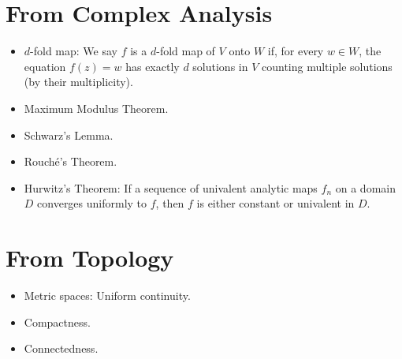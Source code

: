 \section*{From Complex Analysis}
\begin{itemize}
    \item $d$-fold map: We say $f$ is a $d$-fold map of $V$ onto $W$ if, for
    every $w \in W$, the equation $f(z) = w$ has exactly $d$ solutions in $V$
    counting multiple solutions (by their multiplicity).
    \item Maximum Modulus Theorem.
    \item Schwarz's Lemma.
    \item Rouché's Theorem.
    \item Hurwitz's Theorem: If a sequence of univalent analytic maps $f_n$ on a
    domain $D$ converges uniformly to $f$, then $f$ is either constant or
    univalent in $D$.
\end{itemize}

\section*{From Topology}
\begin{itemize}
    \item Metric spaces: Uniform continuity.
    \item Compactness.
    \item Connectedness.
\end{itemize}

\tableofcontents